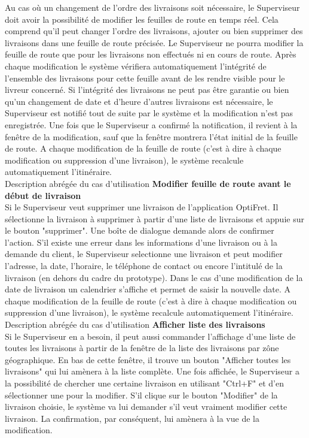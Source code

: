 \documentclass[a4paper]{article}
\begin{document}
Au cas où un changement de l'ordre des livraisons soit nécessaire, le
Superviseur doit avoir la possibilité de modifier les feuilles de route en
temps réel. Cela comprend qu'il peut changer l'ordre des livraisons, ajouter ou
bien supprimer des livraisons dans une feuille de route précisée. Le
Superviseur ne pourra modifier la feuille de route que pour les livraisons non
effectués ni en cours de route. Après chaque modification le système vérifiera
automatiquement l'intégrité de l'ensemble des livraisons pour cette feuille
avant de les rendre visible pour le livreur concerné.
Si l'intégrité des livraisons ne peut pas être garantie ou bien qu'un
changement de date et d'heure d'autres livraisons est nécessaire, le
Superviseur est notifié tout de suite par le système et la modification n'est
pas enregistrée. Une fois que le Superviseur a confirmé la notification, il
revient à la fenêtre de la modification, sauf que la fenêtre montrera l'état
initial de la feuille de route.
A chaque modification de la feuille de route (c'est à dire à chaque
modification ou suppression d'une livraison), le système recalcule
automatiquement l'itinéraire. \\

Description abrégée du cas d'utilisation
\textbf{Modifier feuille de route avant le début de livraison} \\

Si le Superviseur veut supprimer une livraison de l'application OptiFret. Il
sélectionne la livraison à supprimer à partir d'une liste de livraisons et
appuie sur le bouton "supprimer". Une boîte de dialogue demande alors de
confirmer l'action.
S'il existe une erreur dans les informations d'une livraison ou à la demande du
client, le Superviseur selectionne une livraison et peut modifier l'adresse, la
date, l'horaire, le téléphone de contact ou encore l'intitulé de la livraison
(en dehors du cadre du prototype). Dans le cas d'une modification de la date de
livraison un calendrier s'affiche et permet de saisir la nouvelle date.
A chaque modification de la feuille de route (c'est à dire à chaque
modification ou suppression d'une livraison), le système recalcule
automatiquement l'itinéraire. \\

Description abrégée du cas d'utilisation
\textbf{Afficher liste des livraisons} \\

Si le Superviseur en a besoin, il peut aussi commander l'affichage d'une liste
de toutes les livraisons à partir de la fenêtre de la liste des livraisons par
zône géographique. En bas de cette fenêtre, il trouve un bouton "Afficher
toutes les livraisons" qui lui amènera à la liste complète. Une fois affichée,
le Superviseur a la possibilité de chercher une certaine livraison en utilisant
"Ctrl+F" et d'en sélectionner une pour la modifier. S'il clique sur le bouton
"Modifier" de la livraison choisie, le système va lui demander s'il veut
vraiment modifier cette livraison. La confirmation, par conséquent, lui amènera
à la vue de la modification. \\
\end{document}
